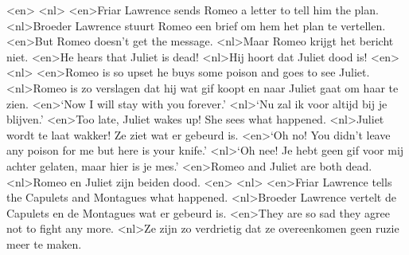 <en>
<nl>
<en>Friar Lawrence sends Romeo a letter to tell him the plan. 
<nl>Broeder Lawrence stuurt Romeo een brief om hem het plan te vertellen.
<en>But Romeo doesn’t get the message. 
<nl>Maar Romeo krijgt het bericht niet.
<en>He hears that Juliet is dead!
<nl>Hij hoort dat Juliet dood is!
<en>
<nl>
<en>Romeo is so upset he buys some poison and goes to see Juliet.
<nl>Romeo is zo verslagen dat hij wat gif koopt en naar Juliet gaat om haar te zien.
<en>‘Now I will stay with you forever.’
<nl>`Nu zal ik voor altijd bij je blijven.'
<en>Too late, Juliet wakes up! She sees what happened.
<nl>Juliet wordt te laat wakker! Ze ziet wat er gebeurd is.
<en>‘Oh no! You didn’t leave any poison for me but here is your knife.’
<nl>`Oh nee! Je hebt geen gif voor mij achter gelaten, maar hier is je mes.'
<en>Romeo and Juliet are both dead. 
<nl>Romeo en Juliet zijn beiden dood.
<en>
<nl>
<en>Friar Lawrence tells the Capulets and Montagues what happened. 
<nl>Broeder Lawrence vertelt de Capulets en de Montagues wat er gebeurd is.
<en>They are so sad they agree not to fight any more.
<nl>Ze zijn zo verdrietig dat ze overeenkomen geen ruzie meer te maken.

